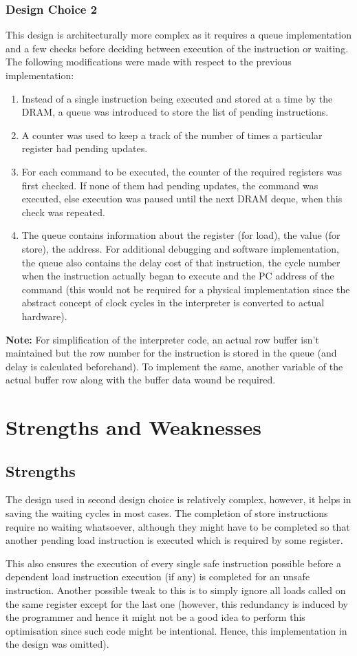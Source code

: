 \documentclass{article}
\begin{document}
\subsubsection{Design Choice 2}
This design is architecturally more complex as it requires a queue implementation and a few checks before deciding between execution of the instruction or waiting. The following modifications were made with respect to the previous implementation:
\begin{enumerate}
    \item Instead of a single instruction being executed and stored at a time by the DRAM, a queue was introduced to store the list of pending instructions.
    \item A counter was used to keep a track of the number of times a particular register had pending updates.
    \item For each command to be executed, the counter of the required registers was first checked. If none of them had pending updates, the command was executed, else execution was paused until the next DRAM deque, when this check was repeated.
    \item The queue contains information about the register (for load), the value (for store), the address. For additional debugging and software implementation, the queue also contains the delay cost of that instruction, the cycle number when the instruction actually began to execute and the PC address of the command (this would not be required for a physical implementation since the abstract concept of clock cycles in the interpreter is converted to actual hardware).
\end{enumerate}
\textbf{Note:} For simplification of the interpreter code, an actual row buffer isn't maintained but the row number for the instruction is stored in the queue (and delay is calculated beforehand). To implement the same, another variable of the actual buffer row along with the buffer data wound be required.


\section{Strengths and Weaknesses}
\subsection{Strengths}
The design used in second design choice is relatively complex, however, it helps in saving the waiting cycles in most cases. The completion of store instructions require no waiting whatsoever, although they might have to be completed so that another pending load instruction is executed which is required by some register.\par
This also ensures the execution of every single safe instruction possible before a dependent load instruction execution (if any) is completed for an unsafe instruction. Another possible tweak to this is to simply ignore all loads called on the same register except for the last one (however, this redundancy is induced by the programmer and hence it might not be a good idea to perform this optimisation since such code might be intentional. Hence, this implementation in the design was omitted).
\end{document}
